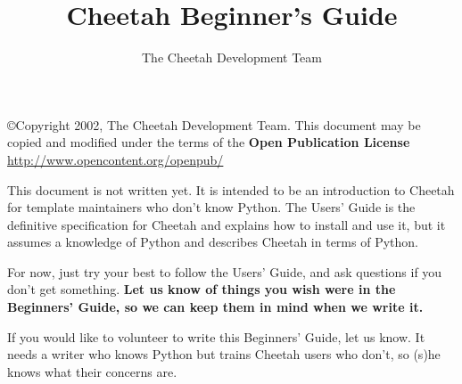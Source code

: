 \documentclass{howto}
\title{Cheetah Beginner's Guide}
\author{The Cheetah Development Team}
\begin{document}
\maketitle


\tableofcontents

\copyright{Copyright 2002, The Cheetah Development Team.
      This document may be copied and modified under the terms of the
      {\bf Open Publication License} \url{http://www.opencontent.org/openpub/} }

This document is not written yet.  It is intended to be an introduction to
Cheetah for template maintainers who don't know Python.  The Users' Guide is
the definitive specification for Cheetah and explains how to install and use
it, but it assumes a knowledge of Python and describes Cheetah in terms of
Python.  

For now, just try your best to follow the Users' Guide, and ask questions if
you don't get something.  {\bf Let us know of things you wish were in the
Beginners' Guide, so we can keep them in mind when we write it.}

If you would like to volunteer to write this Beginners' Guide, let us know.
It needs a writer who knows Python but trains Cheetah users who don't, so
(s)he knows what their concerns are.


\end{document}
